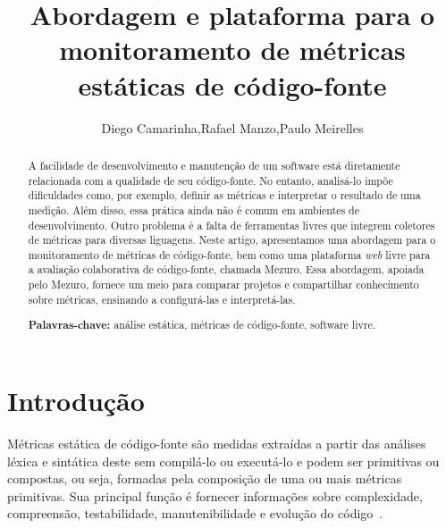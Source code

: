 \documentclass{llncs}
\begin{document}
\sloppy
\title{Abordagem e plataforma para o monitoramento de métricas estáticas de código-fonte}

\author{Diego Camarinha,Rafael Manzo,Paulo Meirelles}


\maketitle


\begin{abstract}

A facilidade de desenvolvimento e manutenção de um software está
diretamente relacionada com a qualidade de seu código-fonte.
No entanto, analisá-lo impõe dificuldades como, por exemplo, definir as
métricas e interpretar o resultado de uma medição. Além disso, essa prática
ainda não é comum em ambientes de desenvolvimento. Outro problema é a falta de
ferramentas livres que integrem coletores de métricas para diversas liguagens.
Neste artigo, apresentamos uma abordagem para o monitoramento de métricas de
código-fonte, bem como uma plataforma \textit{web} livre para a avaliação
colaborativa de código-fonte, chamada Mezuro. Essa abordagem, apoiada pelo
Mezuro, fornece um meio para comparar projetos e compartilhar conhecimento
sobre métricas, ensinando a configurá-las e interpretá-las.

\textbf{Palavras-chave:} análise estática, métricas de código-fonte, software
livre.

\end{abstract}


\section{Introdução}
\label{sec:intro}

Métricas estática de código-fonte são medidas extraídas a partir das análises
léxica e sintática deste sem compilá-lo ou executá-lo e podem ser primitivas ou
compostas, ou seja, formadas pela composição de uma ou mais métricas
primitivas. Sua principal função é fornecer informações sobre complexidade,
compreensão, testabilidade, manutenibilidade e evolução do
código~\cite{Henderson-Sellers96,Sato07}.
\end{document}
